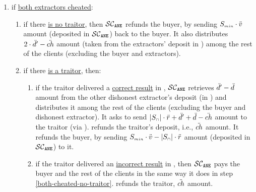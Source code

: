 \begin{itemize}
\begin{enumerate}
%
\item if \underline{both extractors cheated}:
%
\begin{enumerate}[leftmargin=2mm]
%
\item\label{both-cheated-no-traitor} if there \underline{is no traitor}, then $\mathcal{SC}_{\mathtt{ANE}}$ refunds the buyer, by sending $S_{\scriptscriptstyle min}\cdot \ddot{v}$ amount (deposited in $\mathcal{SC}_{\mathtt{ANE}}$) back to the buyer. It also distributes $2\cdot \ddot{d}'- \ddot{ch}$ amount (taken from the extractors' deposit in \SCpc) among the rest of  the clients  (excluding the buyer and extractors). %
%
%
\item if there \underline{is a traitor}, then:
\begin{enumerate}
%
%
\item\label{both-cheated-honest-traitor} if the traitor delivered a \underline{correct result} in \SCtc, $\mathcal{SC}_{\mathtt{ANE}}$ retrieves $\ddot{d}'-\ddot{d}$ amount from the other dishonest extractor's deposit (in \SCpc) and distributes it among the rest of the clients (excluding the buyer and dishonest extractor). It asks \SCpc to send $|S_{\scriptscriptstyle\cap}|\cdot \ddot{r}+\ddot{d}'+\ddot{d}-\ddot{ch}$ amount to the traitor (via \SCtc). %
%
\SCtc refunds the traitor's deposit, i.e., $\ddot{ch}$ amount. It refunds the buyer, by sending $S_{\scriptscriptstyle min}\cdot \ddot{v}-|S_{\scriptscriptstyle\cap}|\cdot \ddot{r}$ amount (deposited in $\mathcal{SC}_{\mathtt{ANE}}$) to it.


%
\item if the traitor delivered an \underline{incorrect result} in \SCtc, then $\mathcal{SC}_{\mathtt{ANE}}$ pays the buyer and the rest of the clients in the same way it does in step \ref{both-cheated-no-traitor}. 
%
%
%
\SCtc refunds the traitor,  $\ddot{ch}$ amount.  %



\end{enumerate}
\end{enumerate}
\end{enumerate}
\end{itemize}
